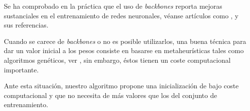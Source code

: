 Se ha comprobado en la práctica que el uso de 
\textit{backbones} reporta mejoras sustanciales en el 
entrenamiento de redes neuronales, véanse artículos como \cite{backbone-object-detection}, \cite{backbone-Architecture} y sus referencias. 

Cuando se carece de \textit{backbones} o no es posible utilizarlos, una buena técnica para dar un valor inicial  a los pesos consiste en basarse en metaheurísticas tales como algoritmos genéticos,
ver \cite{Montana2002NeuralNW}, sin embargo, éstos 
tienen un coste computacional importante. 

Ante esta situación, nuestro algoritmo propone una inicialización de bajo coste computacional y que no necesita de más valores que los del conjunto de entrenamiento. 



